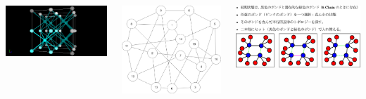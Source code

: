 \documentclass[12pt, dvipdfmx]{beamer}
\begin{document}
\begin{frame}
	\vspace{-1mm}
	\begin{columns}[T, onlytextwidth]
			\includegraphics[width=\textwidth]{8_per.png}
			\vspace{-5mm}
			\begin{center}
				\includegraphics[width=.6\textwidth]{Network.png}
			\end{center}
			\includegraphics[width=\textwidth]{bond_exchg.png}
	\end{columns}

\end{frame}
\end{document}
